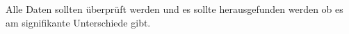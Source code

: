 Alle Daten sollten {\"u}berpr{\"u}ft werden und es sollte herausgefunden werden ob es am signifikante Unterschiede gibt.
























